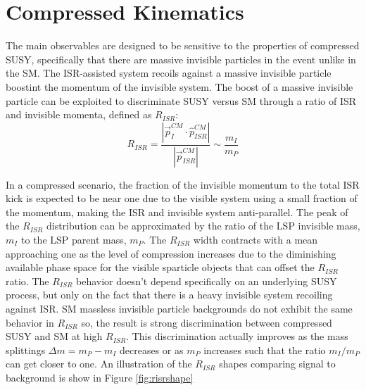 
\section{Compressed Kinematics}

The main observables are designed to be sensitive to the properties of compressed SUSY, specifically that there are massive invisible particles in the event unlike in the SM. The ISR-assisted system recoils against a massive invisible particle boostint the momentum of the invisible system.  The boost of a massive invisible particle can be exploited to discriminate SUSY versus SM through a ratio of ISR and invisible momenta, defined as $R_{ISR}$:
\begin{equation}
R_{ISR} = \frac{|\vec{p}_I^{CM} \cdot \hat{p}_{ISR}^{CM}|}{|\vec{p}_{ISR}^{CM}|} \sim \frac{m_I}{m_P}
\end{equation}

In a compressed scenario, the fraction of the invisible momentum to the total ISR kick is expected to be near one due to the visible system using a small fraction of the momentum, making the ISR and invisible system anti-parallel. The peak of the $R_{ISR}$ distribution can be approximated by the ratio of the LSP invisible mass, $m_I$ to the LSP parent mass, $m_P$.  The $R_{ISR}$  width contracts with a mean approaching one as the level of compression increases due to the diminishing available phase space for the visible sparticle objects that can offset the $R_{ISR}$ ratio. The $R_{ISR}$ behavior doesn't depend specifically on an underlying SUSY process, but only on the fact that there is a heavy invisible system recoiling against ISR.  SM massless invisible particle backgrounds do not exhibit the same behavior in $R_{ISR}$ so, the result is strong discrimination between compressed SUSY and SM at high $R_{ISR}$.  This discrimination actually improves as the mass splittings $\Delta m = m_P - m_I$ decreases or as $m_P$ increases such that the ratio $m_I/m_P$ can get closer to one. An illustration of the $R_{ISR}$ shapes comparing signal to background is show in Figure \ref{fig:risrshape}

